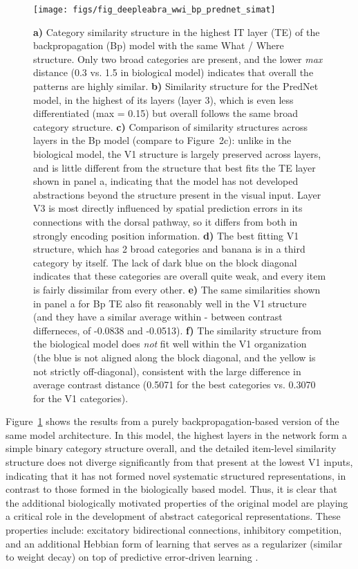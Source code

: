 \documentclass[12pt,twoside]{article}
\newif\myifpdf
\begin{document}
\begin{figure}
  \centering\texttt{[image: figs/fig\_deepleabra\_wwi\_bp\_prednet\_simat]}
  \caption{\small {\bf a)} Category similarity structure in the highest IT layer (TE) of the backpropagation (Bp) model with the same What / Where structure.  Only two broad categories are present, and the lower {\em max} distance (0.3 vs. 1.5 in biological model) indicates that overall the patterns are highly similar.  {\bf b)} Similarity structure for the PredNet model, in the highest of its layers (layer 3), which is even less differentiated (max = 0.15) but overall follows the same broad category structure.  {\bf c)} Comparison of similarity structures across layers in the Bp model (compare to Figure~2c): unlike in the biological model, the V1 structure is largely preserved across layers, and is little different from the structure that best fits the TE layer shown in panel a, indicating that the model has not developed abstractions beyond the structure present in the visual input.  Layer V3 is most directly influenced by spatial prediction errors in its connections with the dorsal pathway, so it differs from both in strongly encoding position information.  {\bf d)} The best fitting V1 structure, which has 2 broad categories and banana is in a third category by itself.  The lack of dark blue on the block diagonal indicates that these categories are overall quite weak, and every item is fairly dissimilar from every other.  {\bf e)} The same similarities shown in panel a for Bp TE also fit reasonably well in the V1 structure (and they have a similar average within - between contrast differneces, of -0.0838 and -0.0513).  {\bf f)} The similarity structure from the biological model does {\em not} fit well within the V1 organization (the blue is not aligned along the block diagonal, and the yellow is not strictly off-diagonal), consistent with the large difference in average contrast distance (0.5071 for the best categories vs. 0.3070 for the V1 categories).}
  \label{fig.bpred}
\end{figure}

Figure~\ref{fig.bpred} shows the results from a purely backpropagation-based version of the same model architecture.  In this model, the highest layers in the network form a simple binary category structure overall, and the detailed item-level similarity structure does not diverge significantly from that present at the lowest V1 inputs, indicating that it has not formed novel systematic structured representations, in contrast to those formed in the biologically based model.  Thus, it is clear that the additional biologically motivated properties of the original model are playing a critical role in the development of abstract categorical representations. These properties include: excitatory bidirectional connections, inhibitory competition, and an additional Hebbian form of learning that serves as a regularizer (similar to weight decay) on top of predictive error-driven learning \cite{OReilly98,OReillyMunakata00}.
\end{document}
